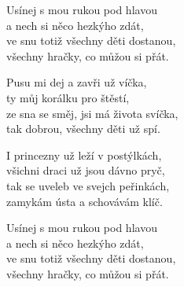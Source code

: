 
\ve{}
Usínej s mou rukou pod hlavou\\
a nech si něco hezkýho zdát,\\
ve snu totiž všechny děti dostanou,\\
všechny hračky, co můžou si přát. 

\cho{}
Pusu mi dej a zavři už víčka,\\
ty můj korálku pro štěstí,\\
ze sna se směj, jsi má života svíčka,\\
tak dobrou, všechny děti už spí. 

\ve{}
I princezny už leží v postýlkách,\\
všichni draci už jsou dávno pryč,\\
tak se uveleb ve svejch peřinkách,\\
zamykám ústa a schovávám klíč. 

\cho{}

\ve{}
Usínej s mou rukou pod hlavou\\
a nech si něco hezkýho zdát,\\
ve snu totiž všechny děti dostanou,\\
všechny hračky, co můžou si přát. 

\cho{}
\esong